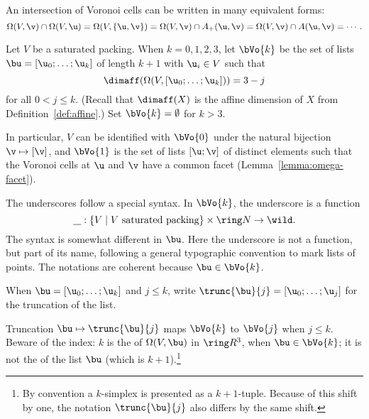 \begin{cnl}
An intersection of Voronoi cells can be written in many equivalent forms:
\[  
  \Omega(V,\v)\cap \Omega(V,\u) =\Omega(V,\braced{\u,\v})
 = \Omega(V,\v)\cap \Aplus(\u,\v) 
  = \Omega(V,\v)\cap \AA{\u}{\v} =  \cdots.
\] 

\begin{definition}[$\bV$]
\label{def:bV}
%
Let $V$ be a saturated packing.  When $k=0,1,2,3$, let $ \bVo{k}$ be
the set of lists $\bu=\listdots{\u}{0}{k}$ of length $k+1$ with $
\u_i\in V$ such that
\begin{equation}\label{eqn:omega-dim} 
\dimaff(\Omega(V,\listdots{\u}{0}{k})) = 3-j
\end{equation}
for all $0<j\le k$.  (Recall that $\dimaff(X)$ is the affine dimension
of $X$ from Definition~\ref{def:affine}.)  Set $\bVo{k}=\emptyset$ for
$k>3$.  
\end{definition}
%

In particular, $V$ can be identified with $\bVo{0}$ under the natural
bijection $\v\mapsto[\v]$, and $\bVo{1}$ is the set of lists $[\u;\v]$
of distinct elements such that the Voronoi cells at $ \u$ and $\v$
have a common facet (Lemma~\ref{lemma:omega-facet}).  

\begin{notation}[underscore]
  The underscores follow a special syntax.  In $\bVo{k}$, the
  underscore is a function
\[  
\underline{\phantom V}:\setcomp{V }{ \text{$V$ saturated packing} }
\times \Nat \to \wild.
\] 
 The syntax is somewhat different in $\bu$.  Here the
underscore is not a function, but part of its name, following a
general typographic convention to mark lists of points. The notations
are coherent because $\bu\in\bVo{k}$.
\end{notation}

\begin{notation}[$\trunc{\bu}{j}$]
%
When $\bu=\listdots{\u}{0}{k}$ and $j\le k$, write $\trunc{\bu}{j} =
\listdots{\u}{0}{j}$ for the truncation of the list.
\end{notation}

Truncation $\bu\mapsto\trunc{\bu}{j}$ maps $\bVo{k}$ to $\bVo{j}$ when
$j\le k$.  Beware of the index: $k$ is the  of
$\Omega(V,\bu)$ in $\vecR{3}$, when $\bu\in \bVo{k}$; it is not the
 of the list $\bu$ (which is $k+1$).\footnote{By
  convention a $k$-simplex is presented as a $k+1$-tuple.  Because of
  this shift by one, the notation $\trunc{\bu}{j}$ also differs by the
  same shift.}



\end{cnl}
